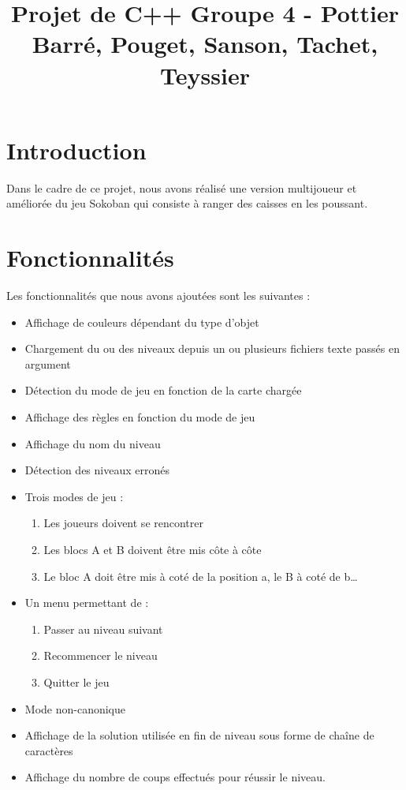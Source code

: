 \documentclass{article}
\begin{document}
\title{Projet de C++ Groupe 4 - Pottier Barré, Pouget, Sanson, Tachet, Teyssier}
\date{}
\maketitle

\section{Introduction}

Dans le cadre de ce projet, nous avons réalisé une version multijoueur et améliorée du jeu Sokoban qui consiste à ranger des caisses en les poussant. \\

\section{Fonctionnalités}

Les fonctionnalités que nous avons ajoutées sont les suivantes :
\begin{itemize}
    \item Affichage de couleurs dépendant du type d'objet
    \item Chargement du ou des niveaux depuis un ou plusieurs fichiers texte passés en argument
    \item Détection du mode de jeu en fonction de la carte chargée
    \item Affichage des règles en fonction du mode de jeu
    \item Affichage du nom du niveau
    \item Détection des niveaux erronés
    \item Trois modes de jeu :
    \begin{enumerate}
        \item Les joueurs doivent se rencontrer
        \item Les blocs A et B doivent être mis côte à côte
        \item Le bloc A doit être mis à coté de la position a, le B à coté de b…
    \end{enumerate}
    \item Un menu permettant de :
    \begin{enumerate}
        \item Passer au niveau suivant
        \item Recommencer le niveau
        \item Quitter le jeu
    \end{enumerate}
    \item Mode non-canonique
    \item Affichage de la solution utilisée en fin de niveau sous forme de chaîne de caractères
    \item Affichage du nombre de coups effectués pour réussir le niveau.
\end{itemize}
\end{document}
